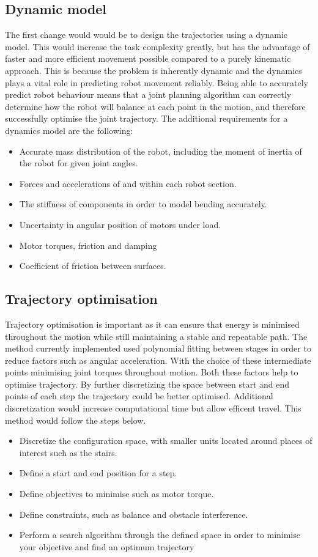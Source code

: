 \documentclass[twoside,twocolumn]{article}
\begin{document}
\subsection{Dynamic model}
The first change would would be to design the trajectories using a dynamic model. This would increase the task complexity greatly, but has the advantage of faster and more efficient movement possible compared to a purely kinematic approach. This is because the problem is inherently dynamic and the dynamics plays a vital role in predicting robot movement reliably. Being able to accurately predict robot behaviour means that a joint planning algorithm can correctly determine how the robot will balance at each point in the motion, and therefore successfully optimise the joint trajectory.
The additional requirements for a dynamics model are the following:
\begin{itemize}
\item Accurate mass distribution of the robot, including the moment of inertia of the robot for given joint angles.
\item Forces and accelerations of and within each robot section.
\item The stiffness of components in order to model bending accurately.
\item Uncertainty in angular position of motors under load.
\item Motor torques, friction and damping
\item Coefficient of friction between surfaces.
\end{itemize}

\subsection{Trajectory optimisation}
Trajectory optimisation is important as it can ensure that energy is minimised throughout the motion while still maintaining a stable and repeatable path. The method currently implemented used polynomial fitting between stages in order to reduce factors such as angular acceleration. With the choice of these intermediate points minimising joint torques throughout motion. Both these factors help to optimise trajectory. By further discretizing the space between start and end points of each step the trajectory could be better optimised. Additional discretization would increase computational time but allow efficent travel. This method would follow the steps below.
\begin{itemize}
\item Discretize the configuration space, with smaller units located around places of interest such as the stairs.
\item Define a start and end position for a step.
\item Define objectives to minimise such as motor torque.
\item Define constraints, such as balance and obstacle interference.
\item Perform a search algorithm through the defined space in order to minimise your objective and find an optimum trajectory
\end{itemize}
\end{document}
